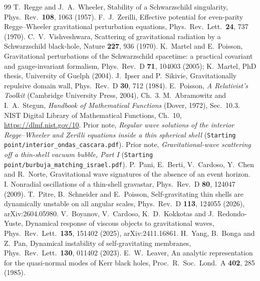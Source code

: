 \documentclass[11pt,a4paper]{article}
\numberwithin{equation}{section}
\begin{document}
\begin{thebibliography}{99}\small
{} T.~Regge and J.~A.~Wheeler, Stability of a Schwarzschild singularity, Phys.\ Rev.\ \textbf{108}, 1063 (1957).
 F.~J.~Zerilli, Effective potential for even-parity Regge--Wheeler gravitational perturbation equations, Phys.\ Rev.\ Lett.\ \textbf{24}, 737 (1970).
 C.~V.~Vishveshwara, Scattering of gravitational radiation by a Schwarzschild black-hole, Nature \textbf{227}, 936 (1970).
 K.~Martel and E.~Poisson, Gravitational perturbations of the Schwarzschild spacetime: a practical covariant and gauge-invariant formalism, Phys.\ Rev.\ D \textbf{71}, 104003 (2005); K.~Martel, PhD thesis, University of Guelph (2004).
 J.~Ipser and P.~Sikivie, Gravitationally repulsive domain wall, Phys.\ Rev.\ D \textbf{30}, 712 (1984).
 E.~Poisson, \emph{A Relativist's Toolkit} (Cambridge University Press, 2004), Ch.~3.
 M.~Abramowitz and I.~A.~Stegun, \emph{Handbook of Mathematical Functions} (Dover, 1972), Sec.~10.3.
 NIST Digital Library of Mathematical Functions, Ch.~10, \url{https://dlmf.nist.gov/10}.
 Prior note, \emph{Regular wave solutions of the interior Regge--Wheeler and Zerilli equations inside a thin spherical shell} (\texttt{Starting point/interior\_ondas\_cascara.pdf}).
 Prior note, \emph{Gravitational-wave scattering off a thin-shell vacuum bubble, Part I} (\texttt{Starting point/burbuja\_matching\_israel.pdf}).
 P.~Pani, E.~Berti, V.~Cardoso, Y.~Chen and R.~Norte, Gravitational wave signatures of the absence of an event horizon. I. Nonradial oscillations of a thin-shell gravastar, Phys.\ Rev.\ D \textbf{80}, 124047 (2009).
 T.~Pitre, B.~Schneider and E.~Poisson, Self-gravitating thin shells are dynamically unstable on all angular scales, Phys.\ Rev.\ D \textbf{113}, 124055 (2026), arXiv:2604.05980.
 V.~Boyanov, V.~Cardoso, K.~D.~Kokkotas and J.~Redondo-Yuste, Dynamical response of viscous objects to gravitational waves, Phys.\ Rev.\ Lett.\ \textbf{135}, 151402 (2025), arXiv:2411.16861.
 H.~Yang, B.~Bonga and Z.~Pan, Dynamical instability of self-gravitating membranes, Phys.\ Rev.\ Lett.\ \textbf{130}, 011402 (2023).
 E.~W.~Leaver, An analytic representation for the quasi-normal modes of Kerr black holes, Proc.\ R.\ Soc.\ Lond.\ A \textbf{402}, 285 (1985).

\end{thebibliography}
\end{document}
